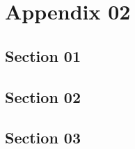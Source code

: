 \chapter{Appendix 02}
\section{Section 01}
\lipsum[1-3]
\section{Section 02}
\lipsum[1-3]
\section{Section 03}
\lipsum[1-3]